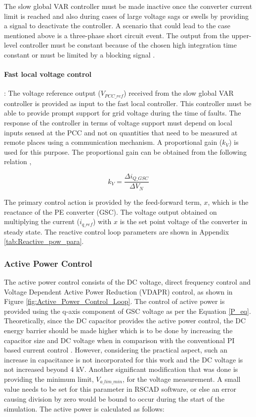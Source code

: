 The slow global VAR controller must be made inactive once the converter current limit is reached and also during cases of large voltage sags or swells by providing a signal to deactivate the controller. A scenario that could lead to the case mentioned above is a three-phase short circuit event. The output from the upper-level controller must be constant because of the chosen high integration time constant or must be limited by a blocking signal \cite{korai_dynamic_2019}.

\paragraph{Fast local voltage control}:
The voltage reference output ($V_{PCC\_ref}$) received from the slow global VAR controller is provided as input to the fast local controller. This controller must be able to provide prompt support for grid voltage during the time of faults. The response of the controller in terms of voltage support must depend on local inputs sensed at the \gls{PCC} and not on quantities that need to be measured at remote places using a communication mechanism. A proportional gain ($k_V$) is used for this purpose. The proportional gain can be obtained from the following relation \cite{korai_dynamic_2019},

\begin{equation}
    k_V = \frac{\Delta i_{Q\_GSC}}{\Delta V_N }
\end{equation}

The primary control action is provided by the feed-forward term, $x$, which is the reactance of the \gls{PE} converter (\gls{GSC}). The voltage output obtained on multiplying the current ($i_{q\_ref}$) with $x$ is the set point voltage of the converter in steady state. The reactive control loop parameters are shown in Appendix \ref{tab:Reactive_pow_para}.

\subsubsection{Active Power Control}\label{Active_power_DVC_theory}
The active power control consists of the \gls{DC} voltage, direct frequency control and Voltage Dependent Active Power Reduction (\gls{VDAPR}) control, as shown in Figure \ref{fig:Active_Power_Control_Loop}. The control of active power is provided using the q-axis component of \gls{GSC} voltage as per the Equation \ref{P_eq}. Theoretically, since the \gls{DC} capacitor provides the active power control, the \gls{DC} energy barrier should be made higher which is to be done by increasing the capacitor size and \gls{DC} voltage when in comparison with the conventional \gls{PI} based current control \cite{korai_dynamic_2019}. However, considering the practical aspect, such an increase in capacitance is not incorporated for this work and the \gls{DC} voltage is not increased beyond 4 kV. Another significant modification that was done is providing the minimum limit, $V_{a\_lim\_min}$, for the voltage measurement. A small value needs to be set for this parameter in RSCAD software, or else an error causing division by zero would be bound to occur during the start of the simulation. The active power is calculated as follows: 


